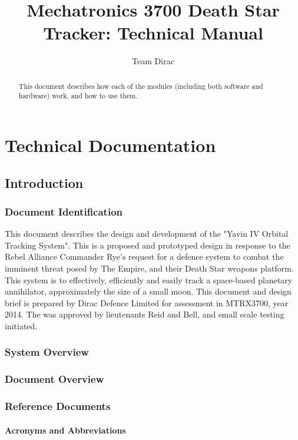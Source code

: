 \documentclass[10pt,a4paper]{report}
\author{Team Dirac}
\title{Mechatronics 3700 Death Star Tracker: Technical Manual}
\begin{document}
\maketitle

\begin{abstract}
	This document describes how each of the modules (including both software and hardware) work, and how to use them.
\end{abstract}

\part{Technical Documentation}
\chapter{Introduction}
\section{Document Identification}
This document describes the design and development of the "Yavin IV Orbital Tracking System". This is a proposed and prototyped design in response to the Rebel Alliance Commander Rye's request for a defence system to combat the imminent threat posed by The Empire, and their Death Star weapons platform. \newline This system is to effectively, efficiently and easily track a space-based planetary annihilator, approximately the size of a small moon. This document and design brief is prepared by Dirac Defence Limited for assessment in MTRX3700, year 2014. The was approved by lieutenants Reid and Bell, and small scale testing initiated. 

\section{System Overview}

\section{Document Overview}

\section{Reference Documents}

\subsection{Acronyms and Abbreviations}
\end{document}
